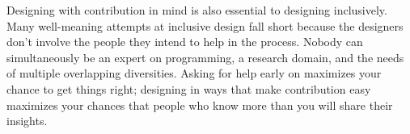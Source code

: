 \documentclass[10pt,letterpaper]{article}
\begin{document}
Designing with contribution in mind is also essential to designing inclusively.
Many well-meaning attempts at inclusive design fall short
because the designers don't involve the people they intend to help in the process.
Nobody can simultaneously be an expert on programming,
a research domain,
and the needs of multiple overlapping diversities.
Asking for help early on maximizes your chance to get things right;
designing in ways that make contribution easy maximizes your chances
that people who know more than you will share their insights.


\end{document}
